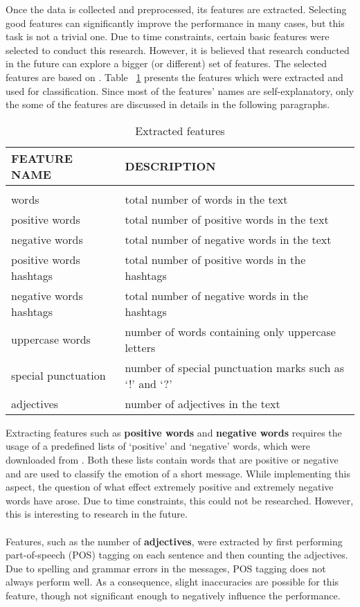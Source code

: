 
Once the data is collected and preprocessed, its features are extracted. Selecting good features can significantly improve the performance in many cases, but this task is not a trivial one. Due to time constraints, certain basic features were selected to conduct this research. However, it is believed that research conducted in the future can explore a bigger (or different) set of features. The selected features are based on \cite{fairytales}. Table ~\ref{featuretable} presents the features which were extracted and used for classification. Since most of the features' names are self-explanatory, only the some of the features are discussed in details in the following paragraphs.


\begin{table}[h!]
\caption{Extracted features}
\label{featuretable}
\begin{center}
\begin{tabular}{ll}
\multicolumn{1}{l}{\bf FEATURE NAME}  &\multicolumn{1}{l}{\bf DESCRIPTION}
\\ \hline \\
words & total number of words in the text \\
positive words & total number of positive words in the text \\
negative words & total number of negative words in the text \\
positive words hashtags & total number of positive words in the hashtags \\
negative words hashtags & total number of negative words in the hashtags \\
uppercase words & number of words containing only uppercase letters \\
special punctuation & number of special punctuation marks such as `!' and `?' \\
adjectives & number of adjectives in the text 
\end{tabular}{}
\end{center}
\end{table}



\noindent Extracting features such as \textbf{positive words} and \textbf{negative words} requires the usage of a predefined lists of `positive' and `negative' words, which were downloaded from \cite{hu2004mining}. Both these lists contain words that are positive or negative and are used to classify the emotion of a short message. While implementing this aspect, the question of what effect extremely positive and extremely negative words have arose. Due to time constraints, this could not be researched. However, this is interesting to research in the future. %
\\
\\
Features, such as the number of \textbf{adjectives}, were extracted by first performing part-of-speech (POS) tagging on each sentence and then counting the adjectives. Due to spelling and grammar errors in the messages, POS tagging does not always perform  well. As a consequence, slight inaccuracies are possible for this feature, though not significant enough to negatively influence the performance. %

